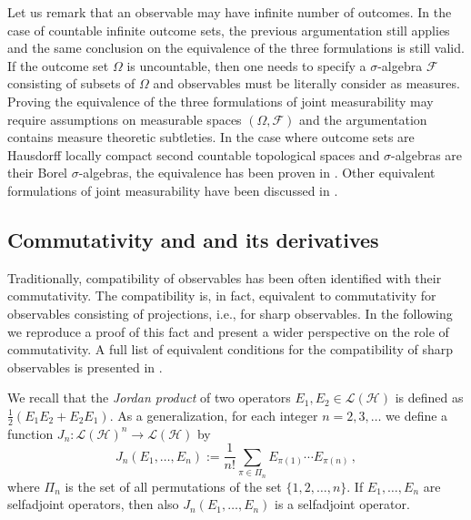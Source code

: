\documentclass[12pt]{article}
\theoremstyle{definition}
\newcommand{\half}{\tfrac{1}{2}} %
\newcommand{\lh}{\mathcal{L(H)}} %
\begin{document}
Let us remark that an observable may have infinite number of outcomes.
In the case of countable infinite outcome sets, the previous argumentation still applies and the same conclusion on the equivalence of the three formulations is still valid.
If the outcome set $\Omega$ is uncountable, then one needs to specify a $\sigma$-algebra $\mathcal{F}$ consisting of subsets of $\Omega$ and observables must be literally consider as measures.
Proving the equivalence of the three formulations of joint measurability may require assumptions on measurable spaces $(\Omega,\mathcal{F})$ and the argumentation contains measure theoretic subtleties.
In the case where outcome sets are Hausdorff locally compact second countable topological spaces and $\sigma$-algebras are their Borel $\sigma$-algebras, the equivalence has been proven in \cite{AlCaHeTo09}.
Other equivalent formulations of joint measurability have been discussed in \cite{LaYl04}.

\subsection{Commutativity and and its derivatives}\label{sec:comma}

Traditionally, compatibility of observables has been often identified with their commutativity. The compatibility is, in fact, equivalent to commutativity for observables consisting of projections, i.e., for sharp observables. 
In the following we reproduce a proof of this fact and present a wider perspective on the role of commutativity.
A full list of equivalent conditions for the compatibility of sharp observables is presented in \cite{Lahti03}.  

We recall that the \emph{Jordan product} of two operators $E_1,E_2\in\lh$ is defined as $\half (E_1E_2+E_2E_1)$.
As a generalization, for each integer $n=2,3,\ldots$ we define a function $J_{n}:\lh^n\to\lh$ by
\begin{equation}\label{eq:jordan}
J_n(E_1,\ldots,E_n) := \frac{1}{n!} \sum_{\pi\in\Pi_n} E_{\pi(1)}\cdots E_{\pi(n)} \, ,
\end{equation}
where $\Pi_n$ is the set of all permutations of the set $\{1,2,\ldots,n\}$.
If $E_1,\ldots,E_n$ are selfadjoint operators, then also $J_n(E_1,\ldots,E_n)$ is a selfadjoint operator. 
\end{document}
